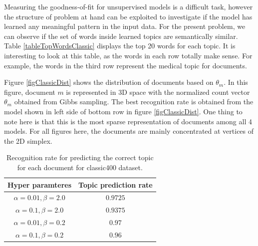\documentclass[twoside,12pt]{article}
\begin{document}
Measuring the goodness-of-fit for unsupervised models is a difficult task, however the structure of problem at hand can be exploited to investigate if the model has learned any meaningful pattern in the input data. For the present problem, we can observe if the set of words inside learned topics are semantically similar. Table \ref{tableTopWordsClassic} displays the top 20 words for each topic. It is interesting to look at this table, as the words in each row totally make sense. For example, the words in the third row represent the medical topic for documents.

Figure \ref{figClassicDist} shows the distribution of documents based on $\theta_m$. In this figure, document $m$ is represented in 3D space with the normalized count vector $\theta_m$ obtained from Gibbs sampling. The best recognition rate is obtained from the model shown in left side of bottom row in figure \ref{figClassicDist}. One thing to note here is that this is the most sparse representation of documents among all 4 models. For all figures here, the documents are mainly concentrated at vertices of the 2D simplex. 


\begin{table}[!]
\begin{center}
\begin{tabular}{| c | c |} 
\hline
\textbf{Hyper paramteres}& \textbf{Topic prediction rate}  \\ \hline

$\alpha=0.01,\beta=2.0$ & $0.9725$ \\ \hline
$\alpha=0.1,\beta=2.0$ &  $0.9375$ \\ \hline
$\alpha=0.01,\beta=0.2$ & $0.97$ \\ \hline
$\alpha=0.1,\beta=0.2$ & $0.96$ \\ \hline
 
\end{tabular}
\caption{Recognition rate for predicting the correct topic for each document for classic400 dataset.}
\label{tableClssicRecognition}
\end{center}
\end{table}
\end{document}
